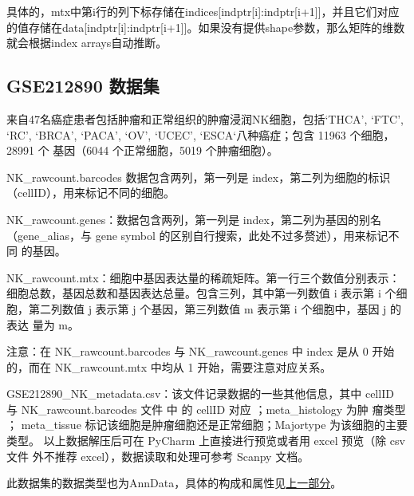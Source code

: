 \documentclass {article}
\begin{document}
		具体的，mtx中第i行的列下标存储在indices[indptr[i]:indptr[i+1]]，并且它们对应的值存储在data[indptr[i]:indptr[i+1]]。如果没有提供shape参数，那么矩阵的维数就会根据index arrays自动推断。
	
	\subsection{GSE212890 数据集}
		来自47名癌症患者包括肿瘤和正常组织的肿瘤浸润NK细胞，包括‘THCA’, ‘FTC’, 
		‘RC’, ‘BRCA’, ‘PACA’, ‘OV’, ‘UCEC’, ‘ESCA‘八种癌症；包含 11963 个细胞， 28991 个 
		基因（6044 个正常细胞，5019 个肿瘤细胞）。 
		
		NK\_rawcount.barcodes 数据包含两列，第一列是 index，第二列为细胞的标识 
		（cellID），用来标记不同的细胞。 
		
		NK\_rawcount.genes：数据包含两列，第一列是 index，第二列为基因的别名 
		（gene\_alias，与 gene symbol 的区别自行搜索，此处不过多赘述），用来标记不同 
		的基因。 
		
		NK\_rawcount.mtx：细胞中基因表达量的稀疏矩阵。第一行三个数值分别表示： 
		细胞总数，基因总数和基因表达总量。包含三列，其中第一列数值 i 表示第 i 个细 
		胞，第二列数值 j 表示第 j 个基因，第三列数值 m 表示第 i 个细胞中，基因 j 的表达 
		量为 m。 
		
		注意：在 NK\_rawcount.barcodes 与 NK\_rawcount.genes 中 index 是从 0 开始 
		的，而在 NK\_rawcount.mtx 中均从 1 开始，需要注意对应关系。
		 
		GSE212890\_NK\_metadata.csv：该文件记录数据的一些其他信息，其中 cellID 与 
		NK\_rawcount.barcodes 文件 中 的 cellID 对应 ；meta\_histology 为肿 瘤类型 ； 
		meta\_tissue 标记该细胞是肿瘤细胞还是正常细胞；Majortype 为该细胞的主要类型。 
		以上数据解压后可在 PyCharm 上直接进行预览或者用 excel 预览（除 csv 文件 
		外不推荐 excel），数据读取和处理可参考 Scanpy 文档。
		
		此数据集的数据类型也为AnnData，具体的构成和属性见\hyperref[构成和属性]{上一部分}。
	
\end{document}
